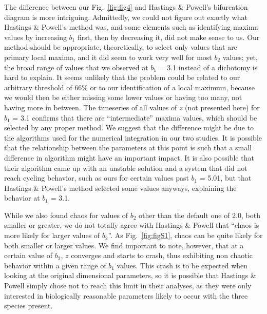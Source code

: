 \documentclass[
]{article}
\begin{document}
The difference between our Fig.~\ref{fig:fig4} and Hastings \& Powell's
bifurcation diagram is more intriguing. Admittedly, we could not figure
out exactly what Hastings \& Powell's method was, and some elements such
as identifying maxima values by increasing \(b_1\) first, then by
decreasing it, did not make sense to us. Our method should be
appropriate, theoretically, to select only values that are primary local
maxima, and it did seem to work very well for most \(b_2\) values; yet,
the broad range of values that we observed at \(b_1\) = 3.1 instead of a
dichotomy is hard to explain. It seems unlikely that the problem could
be related to our arbitrary threshold of 66\% or to our identification
of a local maximum, because we would then be either missing some lower
values or having too many, not having more in between. The timeseries of
all values of \(z\) (not presented here) for \(b_1\) = 3.1 confirms that
there are ``intermediate'' maxima values, which should be selected by
any proper method. We suggest that the difference might be due to the
algorithms used for the numerical integration in our two studies. It is
possible that the relationship between the parameters at this point is
such that a small difference in algorithm might have an important
impact. It is also possible that their algorithm came up with an
unstable solution and a system that did not reach cycling behavior, such
as ours for certain values past \(b_1\) = 5.01, but that Hastings \&
Powell's method selected some values anyways, explaining the behavior at
\(b_1\) = 3.1.

While we also found chaos for values of \(b_2\) other than the default
one of 2.0, both smaller or greater, we do not totally agree with
Hastings \& Powell that ``chaos is more likely for larger values of
\(b_2\)''. As Fig.~\ref{fig:figS1}, chaos can be quite likely for both
smaller or larger values. We find important to note, however, that at a
certain value of \(b_2\), \(z\) converges and starts to crash, thus
exhibiting non chaotic behavior within a given range of \(b_1\) values.
This crash is to be expected when looking at the original dimensional
parameters, so it is possible that Hastings \& Powell simply chose not
to reach this limit in their analyses, as they were only interested in
biologically reasonable parameters likely to occur with the three
species present.
\end{document}
